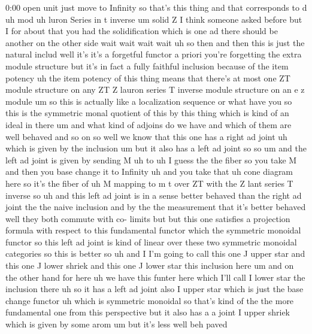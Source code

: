 \begin{unfinished}{0:00}
open  unit  just  move  to  Infinity  so
that's  this  thing  and  that  corresponds
to
d  uh
mod  uh  luron  Series  in  t
inverse  um  solid  Z  I  think  someone  asked
before  but  I  for  about  that  you  had  the
solidification  which  is  one  ad  there
should  be  another  on  the  other  side  wait
wait  wait  wait  uh  so  then  and  then  this
is  just  the  natural  includ  well  it's
it's  a  forgetful  functor  a  priori  you're
forgetting  the  extra  module  structure
but  it's  in  fact  a  fully  faithful
inclusion  because  of  the  item  potency  uh
the  item  potency  of  this  thing  means
that  there's  at  most  one  ZT  module
structure  on  any  ZT  Z  lauron  series  T
inverse  module  structure  on  an  e  z
module  um  so  this  is  actually  like  a
localization  sequence  or  what  have  you
so  this  is  the  symmetric  monal  quotient
of  this  by  this  thing  which  is  kind  of
an  ideal  in  there  um  and  what  kind  of
adjoins  do  we  have  and  which  of  them  are
well  behaved  and  so  on  so  well  we  know
that  this  one  has  a  right  ad  joint  uh
which  is  given  by  the
inclusion
um  but  it  also  has  a  left  ad  joint
so
so
um  and  the  left  ad  joint  is  given  by
sending  M  uh  to
uh  I  guess  the  the  fiber  so  you  take  M
and  then  you  base  change  it  to
Infinity
uh  and  you  take  that  uh  cone  diagram
here  so  it's  the  fiber  of  uh  M  mapping
to  m  t  over  ZT  with  the  Z  lant  series  T
inverse  so  uh  and  this  left  ad  joint  is
in  a  sense  better  behaved  than  the  right
ad  joint  the  the  naive  inclusion  and  by
the  the  measurement  that  it's  better
behaved  well  they  both  commute  with  co-
limits  but  but  this  one  satisfies  a
projection  formula  with  respect  to  this
fundamental  functor  which  the  symmetric
monoidal  functor  so  this  left  ad  joint
is  kind  of  linear  over  these  two
symmetric  monoidal  categories  so  this  is
better  so  uh  and  I  I'm  going  to  call
this  one  J  upper  star  and  this  one  J
lower  shriek  and  this  one  J  lower  star
this  inclusion
here
um  and  on  the  other  hand  for  here  uh  we
have  this  funter  here  which  I'll  call  I
lower  star  the  inclusion  there  uh  so  it
has  a  left  ad  joint  also  I  upper  star
which  is  just  the  base  change
functor  uh  which  is  symmetric  monoidal
so  that's  kind  of  the  the  more
fundamental  one  from  this  perspective
but  it  also  has  a  a  joint  I  upper  shriek
which  is  given  by  some
arom  um  but  it's  less  well  beh  paved

\end{unfinished}
